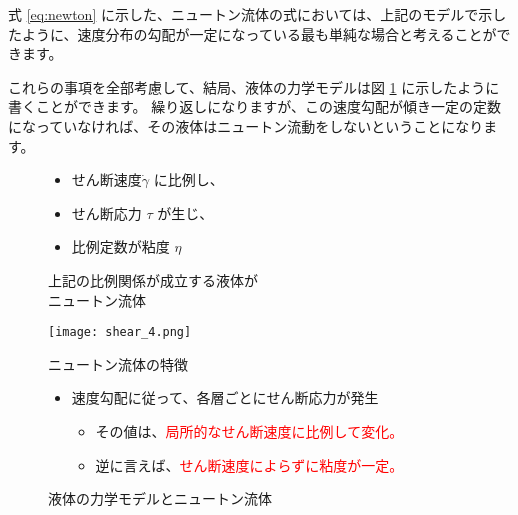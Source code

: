 \documentclass[uplatex,dvipdfmx,a4paper,11pt]{jsarticle}
\begin{document}
式 \eqref{eq:newton} に示した、ニュートン流体の式においては、上記のモデルで示したように、速度分布の勾配が一定になっている最も単純な場合と考えることができます。

これらの事項を全部考慮して、結局、液体の力学モデルは図 \ref{fig:ryudo_model2} に示したように書くことができます。
繰り返しになりますが、この速度勾配が傾き一定の定数になっていなければ、その液体はニュートン流動をしないということになります。

\begin{figure}[htb]
	\begin{center}
		\begin{minipage}{0.45\textwidth}
			\begin{itemize}
				\item せん断速度$\dot{\gamma}$ に比例し、
				\item せん断応力 $\tau$ が生じ、
				\item 比例定数が粘度 $\eta$
			\end{itemize}
			\begin{center}
				\begin{screen}
					\begin{center}
						上記の比例関係が成立する液体が\\ニュートン流体
					\end{center}
				\end{screen}
			\end{center}
		\end{minipage}
		\begin{minipage}{0.45\textwidth}
			\begin{center}
			\texttt{[image: shear\_4.png]}
			\end{center}
		\end{minipage}
		\begin{minipage}{0.9\textwidth}
			\begin{center}
			\begin{itembox}[l]{ニュートン流体の特徴}
				\begin{itemize}
					\item 速度勾配に従って、各層ごとにせん断応力が発生
					\begin{itemize}
						\item その値は、\textcolor{red}{局所的なせん断速度に比例して変化。}
						\item 逆に言えば、\textcolor{red}{せん断速度によらずに粘度が一定。}
					\end{itemize}
				\end{itemize}
			\end{itembox}
			\end{center}
		\end{minipage}
		\caption{液体の力学モデルとニュートン流体}
		\label{fig:ryudo_model2}
	\end{center}
\end{figure}
\end{document}
